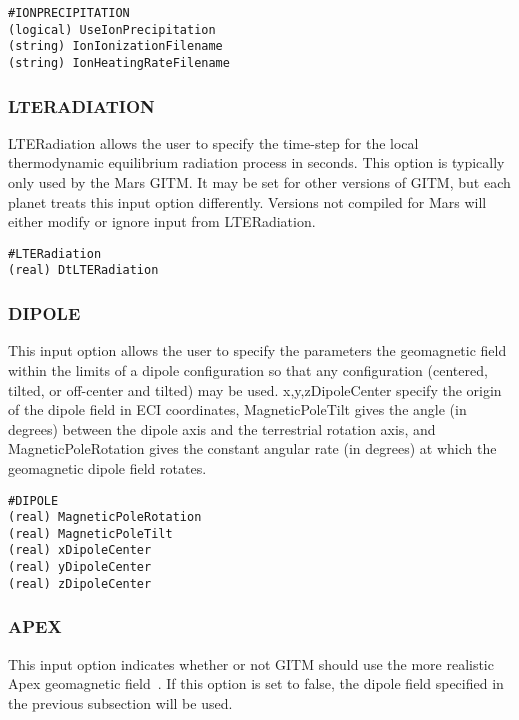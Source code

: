 \begin{verbatim}
#IONPRECIPITATION
(logical) UseIonPrecipitation 
(string) IonIonizationFilename
(string) IonHeatingRateFilename
\end{verbatim}

\subsubsection{LTERADIATION}
\label{lteradiation.sec}

LTERadiation allows the user to specify the time-step for the local thermodynamic equilibrium radiation process in seconds.  This option is typically only used by the Mars GITM.  It may be set for other versions of GITM, but each planet treats this input option differently.  Versions not compiled for Mars will either modify or ignore input from LTERadiation.

\begin{verbatim}
#LTERadiation
(real) DtLTERadiation
\end{verbatim}

\subsubsection{DIPOLE}
\label{dipole.sec}

This input option allows the user to specify the parameters the geomagnetic field within the limits of a dipole configuration so that any configuration (centered, tilted, or off-center and tilted) may be used.  x,y,zDipoleCenter specify the origin of the dipole field in ECI coordinates, MagneticPoleTilt gives the angle (in degrees) between the dipole axis and the terrestrial rotation axis, and MagneticPoleRotation gives the constant angular rate (in degrees) at which the geomagnetic dipole field rotates.

\begin{verbatim}
#DIPOLE
(real) MagneticPoleRotation 
(real) MagneticPoleTilt   
(real) xDipoleCenter       
(real) yDipoleCenter       
(real) zDipoleCenter       
\end{verbatim}

\subsubsection{APEX}
\label{apex.sec}

This input option indicates whether or not GITM should use the more realistic Apex geomagnetic field~\citep{richards:1995aa}.  If this option is set to false, the dipole field specified in the previous subsection will be used.

